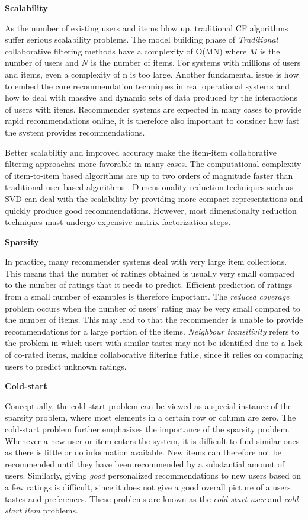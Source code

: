 \textbf{Scalability}

As the number of existing users and items blow up, traditional CF algorithms suffer serious scalability problems. The model building phase of \emph{Traditional} collaborative filtering methods have a complexity of O(MN) where $M$ is the number of users and $N$ is the number of items. For systems with millions of users and items, even a complexity of n is too large. Another fundamental issue is how to embed the core recommendation techniques in real operational systems and how to deal with massive and dynamic sets of data produced by the interactions of users with items. Recommender systems are expected in many cases to provide rapid recommendations online, it is therefore also important to consider how fast the system provides recommendations.

Better scalabiltiy and improved accuracy make the item-item collaborative filtering approaches more favorable in many cases. The computational complexity of item-to-item based algorithms are up to two orders of magnitude faster than traditional user-based algorithms \cite{Deshpande2004}. Dimensionality reduction techniques such as SVD can deal with the scalability by providing more compact representations and quickly produce good recommendations. However, most dimensionalty reduction techniques must undergo expensive matrix factorization steps.\linebreak[4]

\textbf{Sparsity}

In practice, many recommender systems deal with very large item collections. This means that the number of ratings obtained is usually very small compared to the number of ratings that it needs to predict. Efficient prediction of ratings from a small number of examples is therefore important. The \emph{reduced coverage} problem occurs when the number of users' rating may be very small compared to the number of items. This may lead to that the recommender is unable to provide recommendations for a large portion of the items. \emph{Neighbour transitivity} refers to the problem in which users with similar tastes may not be identified due to a lack of co-rated items, making collaborative filtering futile, since it relies on comparing users to predict unknown ratings. \linebreak[4]

\textbf{Cold-start}

Conceptually, the cold-start problem can be viewed as a special instance of the sparsity problem, where most elements in a certain row or column are zero. The cold-start problem further emphasizes the importance of the sparsity problem. Whenever a new user or item enters the system, it is difficult to find similar ones as there is little or no information available. New items can therefore not be recommended until they have been recommended by a substantial amount of users. Similarly, giving \emph{good} personalized recommendations to new users based on a few ratings is difficult, since it does not give a good overall picture of a users tastes and preferences. These problems are known as the \emph{cold-start user} and \emph{cold-start item} problems. \linebreak[4]

